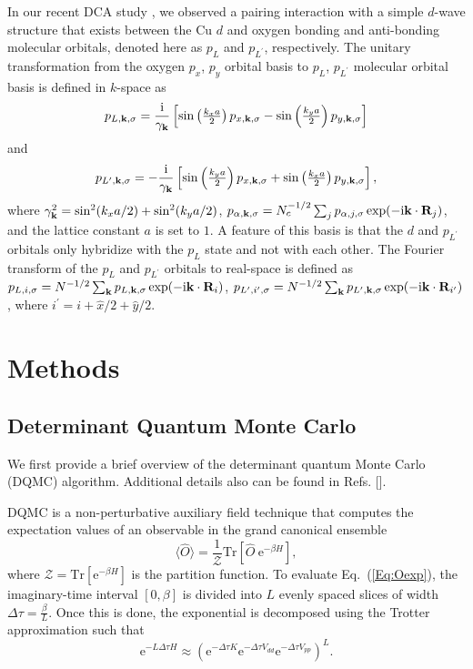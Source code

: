\documentclass[reprint,nofootinbib,nobibnotes,amsmath,amssymb,aps,prb,floatfix]{revtex4-1}
\newcommand{\tr}{{\text {Tr} }}
\newcommand{\beq}{\begin{equation}}
\newcommand{\eeq}{\end{equation}}
\begin{document}
In our recent DCA study \cite{Mai}, we observed a pairing interaction with a simple $d$-wave structure that exists between the Cu $d$ and oxygen bonding and anti-bonding molecular orbitals, denoted here 
as $p_L$ and $p_{L^\prime}$, respectively. The unitary transformation \cite{ZR,Avella2013,Maier4} from the oxygen $p_x$, $p_y$ orbital basis to $p_L$, $p_{L^\prime}$ molecular orbital basis is defined in $k$-space as 
\begin{equation}
p_{L,{\bf k},\sigma}=\frac{\mathrm{i}}{\gamma_{{\bf k}}} \left[\sin\left(\tfrac{k_xa}{2}\right) p_{x,{\bf k},\sigma}- \sin\left(\tfrac{k_ya}{2}\right) p_{y,{\bf k},\sigma}\right]\label{Lk}
\end{equation}
and
\begin{equation}
p_{L^\prime,{\bf k},\sigma}=-\frac{\mathrm{i}}{\gamma_{{\bf k}}} \left[\sin\left(\tfrac{k_ya}{2}\right) p_{x,{\bf k},\sigma}+ \sin\left(\tfrac{k_xa}{2}\right) p_{y,{\bf k},\sigma}\right],\label{Lbark}
\end{equation}
where $\gamma^2_{{\bf k}}=\sin^2(k_xa/2)+\sin^2(k_ya/2)$,  $p_{\alpha,{\bf k},\sigma}=N^{-1/2}_c\sum_{j} p_{\alpha, j ,\sigma}\exp(-\mathrm{i} {\bf k} \cdot {\bf R}_j)$, and the lattice constant $a$ is set to $1$. A feature of this basis is that the $d$ and $p_{L^\prime}$ orbitals only hybridize with the $p_L$ state and not with each other. The Fourier transform of the $p_L$ and $p_{L^\prime}$ orbitals to real-space is defined as $p_{L,i,\sigma}=N^{-1/2} \sum_{\bf k}p_{L,{\bf k},\sigma} \exp(-\mathrm{i} {\bf k} \cdot {\bf R}_i)$, $p_{L^\prime,i^\prime,\sigma}=N^{-1/2} \sum_{\bf k}p_{L^\prime, {\bf k},\sigma} \exp(-\mathrm{i} {\bf k} \cdot {\bf R}_{i^\prime})$, where $i^\prime=i+\hat{x}/2+\hat{y}/2$.

\vskip 0.5cm 
\noindent
\section{Methods}
\subsection{Determinant Quantum Monte Carlo}  
We first provide a brief overview of the determinant quantum Monte Carlo (DQMC) algorithm. Additional details also can be found in Refs. [].  

DQMC is a non-perturbative auxiliary field technique that computes the expectation values of an observable in the grand canonical ensemble
\beq
\langle\hat{O}\rangle =
\frac{1}{\mathcal{Z}}\tr\left[\hat{O} \ \text{e}^{-\beta H}\right],\label{Eq:Oexp}
\eeq
where $\mathcal{Z} = \tr\left[ \text{e}^{-\beta H}\right]$ is the partition function. To evaluate Eq.~(\ref{Eq:Oexp}), the imaginary-time interval $\left[0,\beta\right]$ is divided into $L$ evenly spaced slices of width $\Delta\tau=\tfrac{\beta}{L}$. Once this is done, the exponential is decomposed using the Trotter approximation such that
\beq\nonumber
\text{e}^{-L\Delta\tau H} \approx ( \text{e}^{-\Delta\tau K} \text{e}^{-\Delta\tau V_{dd}} \text{e}^{-\Delta\tau V_{pp}})^L.
\eeq
\end{document}
